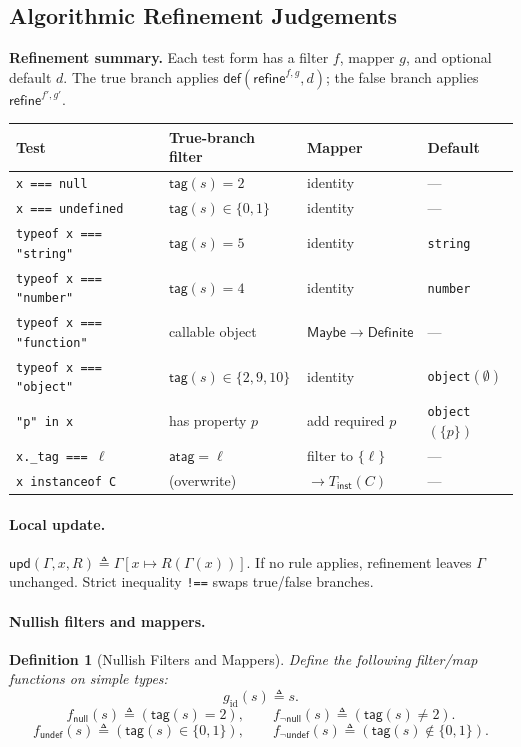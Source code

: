 \documentclass[11pt]{article}
\newtheorem{definition}[theorem]{Definition}
\newcommand{\refineop}{\mathsf{refine}}
\newcommand{\tagfn}{\mathsf{tag}}
\newcommand{\Env}{\Gamma}
\begin{document}
\subsection{Algorithmic Refinement Judgements}
\label{sec:refine-rules}

\begin{keydef}
\textbf{Refinement summary.} Each test form has a filter $f$, mapper $g$, and optional default $d$.
The true branch applies $\mathsf{def}(\refineop^{f,g}, d)$; the false branch applies $\refineop^{f',g'}$.

\smallskip
\renewcommand{\arraystretch}{1.2}
\begin{tabular}{@{}l@{\quad}l@{\quad}l@{\quad}l@{}}
\toprule
\textbf{Test} & \textbf{True-branch filter} & \textbf{Mapper} & \textbf{Default} \\
\midrule
\texttt{x === null} & $\tagfn(s)=2$ & identity & --- \\
\texttt{x === undefined} & $\tagfn(s)\in\{0,1\}$ & identity & --- \\
\texttt{typeof x === "string"} & $\tagfn(s)=5$ & identity & \texttt{string} \\
\texttt{typeof x === "number"} & $\tagfn(s)=4$ & identity & \texttt{number} \\
\texttt{typeof x === "function"} & callable object & $\mathsf{Maybe}\to\mathsf{Definite}$ & --- \\
\texttt{typeof x === "object"} & $\tagfn(s)\in\{2,9,10\}$ & identity & \texttt{object}$(\emptyset)$ \\
\texttt{"p" in x} & has property $p$ & add required $p$ & \texttt{object}$(\{p\})$ \\
\texttt{x.\_tag === $\ell$} & $\mathsf{atag}=\ell$ & filter to $\{\ell\}$ & --- \\
\texttt{x instanceof C} & (overwrite) & $\to T_{\mathsf{inst}}(C)$ & --- \\
\bottomrule
\end{tabular}
\end{keydef}

\paragraph{Local update.}
$\mathsf{upd}(\Env,x,R) \triangleq \Env[x \mapsto R(\Env(x))]$.
If no rule applies, refinement leaves $\Env$ unchanged.
Strict inequality \texttt{!==} swaps true/false branches.

\paragraph{Nullish filters and mappers.}
\begin{definition}[Nullish Filters and Mappers]
\label{def:nullish-filters-mappers}
Define the following filter/map functions on simple types:
\[
g_{\mathrm{id}}(s) \triangleq s.
\]
\[
f_{\mathsf{null}}(s) \triangleq (\tagfn(s)=2),
\qquad
f_{\neg\mathsf{null}}(s) \triangleq (\tagfn(s)\neq 2).
\]
\[
f_{\mathsf{undef}}(s) \triangleq (\tagfn(s)\in\{0,1\}),
\qquad
f_{\neg\mathsf{undef}}(s) \triangleq (\tagfn(s)\notin\{0,1\}).
\]
\end{definition}
\end{document}
